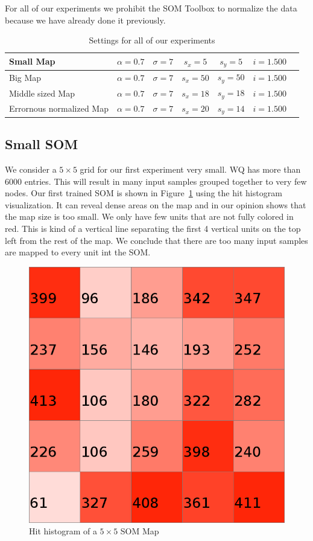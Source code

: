 \documentclass{acm_proc_article-sp}
\begin{document}
For all of our experiments we prohibit the SOM Toolbox to normalize the data because we have
already done it previously.

\begin{table}
\centering
\begin{tabular}{|l|c|c|c|c|c|c|}
    \hline
    Small Map & $\alpha = 0.7$ & $\sigma = 7$ & $s_x=5$ & $s_y=5$ & $i=1.500$ \\
    \hline
    Big Map & $\alpha = 0.7$ & $\sigma = 7$ & $s_x=50$ & $s_y=50$ & $i=1.500$ \\
    \hline
    Middle sized Map & $\alpha = 0.7$ & $\sigma = 7$ & $s_x=18$ & $s_y=18$ & $i=1.500$ \\
    \hline
    Errornous normalized Map & $\alpha = 0.7$ & $\sigma = 7$ & $s_x=20$ & $s_y=14$ & $i=1.500$ \\
    \hline
\end{tabular}
\caption{Settings for all of our experiments}
\label{tab:settings}
\end{table}

\subsection{Small SOM}

We consider a $5\times5$ grid for our first experiment very small. WQ has more than 6000 entries.
This will result in many input samples grouped together to very few nodes. Our first trained
SOM is shown in Figure~\ref{fig:wine-small-hit-histogram} using the hit histogram visualization.
It can reveal dense areas on the map and in our opinion shows that the map size is too small.
We only have few units that are not fully colored in red. This is kind of a vertical line separating
the first 4 vertical units on the top left from the rest of the map. We conclude that there are
too many input samples are mapped to every unit int the SOM.

\begin{figure}
\centering
\includegraphics[width=0.5\linewidth]{img/wine-small-hit-histogram}
\caption{Hit histogram of a $5\times5$ SOM Map}
\label{fig:wine-small-hit-histogram}
\end{figure}
\end{document}
